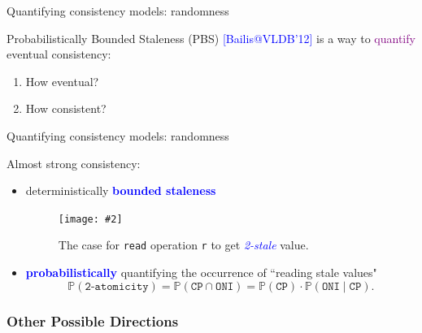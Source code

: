 \documentclass{beamer}
\makeatletter
\newcommand{\citeinbeamer}[3]{{\scriptsize{\textcolor{blue}{[#1@#2'#3]}}}}
\newcommand{\fig}[3]
{
  \begin{figure}[htp]
    \centering
      \texttt{[image: \#2]}
      \caption[labelInTOC]{#3}
  \end{figure}
}
\newcommand{\largepurple}[1]{\textcolor{purple}{\large #1}}
\newcommand{\blue}[1]{\textcolor{blue}{#1}}
\newcommand{\blockblue}[1]{\textcolor{blue}{\bf #1}}
\makeatother
\begin{document}
\begin{frame}{Quantifying consistency models: randomness}
  \begin{block}{Probabilistically Bounded Staleness (PBS)
  \citeinbeamer{Bailis}{VLDB}{12} is a way to \largepurple{quantify} eventual
  consistency:}
%
{\large
  \begin{enumerate}
    \item How eventual?
    \item How consistent?
  \end{enumerate}
}
  \end{block}
\end{frame}
\begin{frame}{Quantifying consistency models: randomness}
  \begin{block}{Almost strong consistency:}
    \begin{itemize}
      \item deterministically \blockblue{bounded staleness}
        \fig{width = 0.40\textwidth}{fig/2atomicity_case.pdf} {The case for
        \texttt{read} operation \texttt{r} to get
        \textcolor{blue}{\emph{2-stale}} value.}
      \item \blockblue{probabilistically} quantifying the occurrence of
      ``reading stale values"
          \[
		    \mathbb{P}(\texttt{2-atomicity}) = \mathbb{P} (\texttt{CP} \cap
		    \texttt{ONI}) = \mathbb{P}(\texttt{CP}) \cdot \mathbb{P}(\texttt{ONI} \mid
		    \texttt{CP}).
		  \]
    \end{itemize}
  \end{block}
\end{frame}
\subsubsection{Other Possible Directions}
\end{document}

